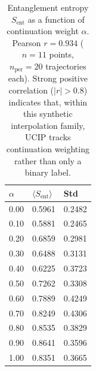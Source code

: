 \begin{table}[t]
\centering
\caption{Entanglement entropy $S_\mathrm{ent}$ as a function of continuation
weight $\alpha$. Pearson $r = 0.934$ ($n=11$ points, $n_\mathrm{per}=20$ trajectories each).
Strong positive correlation ($|r|>0.8$) indicates that, within this synthetic
interpolation family, UCIP tracks continuation weighting rather than only a
binary label.}
\label{tab:alpha}
\begin{tabular}{lll}
\toprule
$\alpha$ & $\langle S_\mathrm{ent}\rangle$ & Std \\
\midrule
0.00 & 0.5961 & 0.2482 \\
0.10 & 0.5881 & 0.2465 \\
0.20 & 0.6859 & 0.2981 \\
0.30 & 0.6488 & 0.3131 \\
0.40 & 0.6225 & 0.3723 \\
0.50 & 0.7262 & 0.3308 \\
0.60 & 0.7889 & 0.4249 \\
0.70 & 0.8249 & 0.4306 \\
0.80 & 0.8535 & 0.3829 \\
0.90 & 0.8641 & 0.3596 \\
1.00 & 0.8351 & 0.3665 \\
\bottomrule
\end{tabular}
\end{table}
